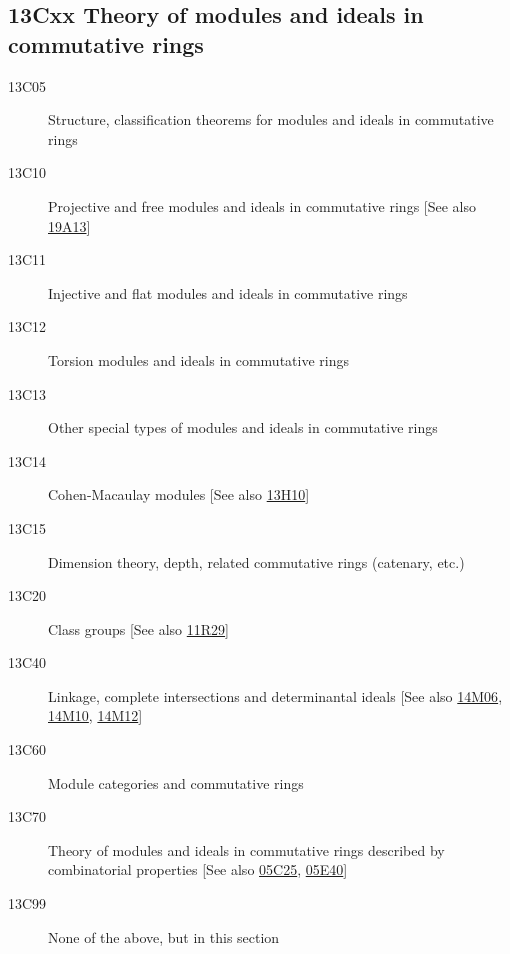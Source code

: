\subsection*{13Cxx Theory of modules and ideals in commutative rings}\label{13Cxx}
\begin{description}               
\item [13C05]\label{13C05} Structure, classification theorems for modules and ideals in commutative rings
\item [13C10]\label{13C10} Projective and free modules and ideals in commutative rings [See also \hyperref[19A13]{19A13}]
\item [13C11]\label{13C11} Injective and flat modules and ideals in commutative rings
\item [13C12]\label{13C12} Torsion modules and ideals in commutative rings
\item [13C13]\label{13C13} Other special types of modules and ideals in commutative rings
\item [13C14]\label{13C14} Cohen-Macaulay modules [See also \hyperref[13H10]{13H10}]
\item [13C15]\label{13C15} Dimension theory, depth, related commutative rings (catenary, etc.)
\item [13C20]\label{13C20} Class groups [See also \hyperref[11R29]{11R29}]
\item [13C40]\label{13C40} Linkage, complete intersections and determinantal ideals [See also \hyperref[14M06]{14M06}, \hyperref[14M10]{14M10}, \hyperref[14M12]{14M12}]
\item [13C60]\label{13C60} Module categories and commutative rings
\item [13C70]\label{13C70} Theory of modules and ideals in commutative rings described by combinatorial properties [See also \hyperref[05C25]{05C25}, \hyperref[05E40]{05E40}]
\item [13C99]\label{13C99} None of the above, but in this section
\end{description}          

